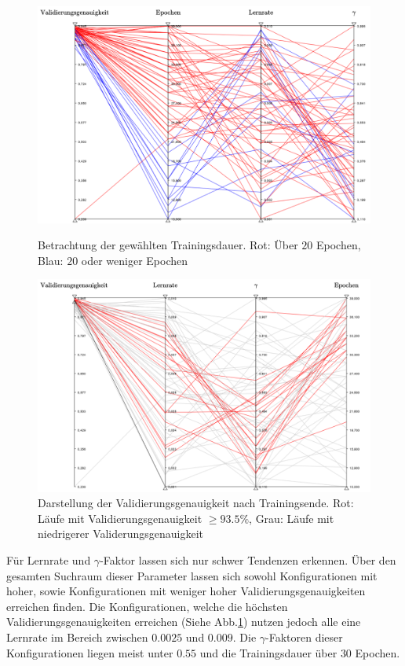 \\
\begin{figure}[h]
\includegraphics[scale=0.58]{NNOPT/attention_epochs.pdf}
\caption{Betrachtung der gewählten Trainingsdauer. Rot: Über $20$ Epochen, Blau: $20$ oder weniger Epochen}
\label{attention_epochs}
\includegraphics[scale=0.58]{NNOPT/attention_top_runs.pdf}
\caption{Darstellung der Validierungsgenauigkeit nach Trainingsende. Rot: Läufe mit Validierungsgenauigkeit $\geq 93.5\%$, Grau: Läufe mit niedrigerer Validerungsgenauigkeit}
\label{attention_top}
\end{figure}
\clearpage
Für Lernrate und $\gamma$-Faktor lassen sich nur schwer Tendenzen erkennen. Über den gesamten Suchraum dieser Parameter lassen sich sowohl Konfigurationen mit hoher, sowie Konfigurationen mit weniger hoher Validierungsgenauigkeiten erreichen finden. Die Konfigurationen, welche die höchsten Validierungsgenauigkeiten erreichen (Siehe Abb.\ref{attention_top}) nutzen jedoch alle eine Lernrate im Bereich zwischen $0.0025$ und $0.009$. Die $\gamma$-Faktoren dieser Konfigurationen liegen meist unter $0.55$ und die Trainingsdauer über $30$ Epochen.
